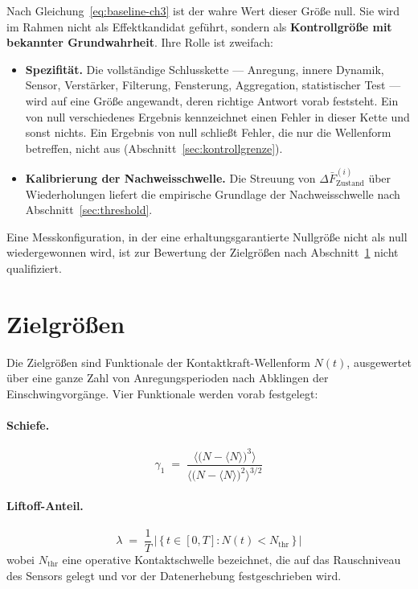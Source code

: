 \documentclass[12pt,a4paper]{report}
\begin{document}
Nach Gleichung~\eqref{eq:baseline-ch3} ist der wahre Wert dieser Größe
null. Sie wird im Rahmen nicht als Effektkandidat geführt, sondern als
\textbf{Kontrollgröße mit bekannter Grundwahrheit}. Ihre Rolle ist
zweifach:

\begin{itemize}
  \item \textbf{Spezifität.} Die vollständige Schlusskette --- Anregung,
        innere Dynamik, Sensor, Verstärker, Filterung, Fensterung,
        Aggregation, statistischer Test --- wird auf eine Größe
        angewandt, deren richtige Antwort vorab feststeht. Ein von null
        verschiedenes Ergebnis kennzeichnet einen Fehler in dieser Kette
        und sonst nichts. Ein Ergebnis von null schließt Fehler, die nur
        die Wellenform betreffen, nicht aus
        (Abschnitt~\ref{sec:kontrollgrenze}).
  \item \textbf{Kalibrierung der Nachweisschwelle.} Die Streuung von
        $\Delta \bar{F}^{(i)}_{\mathrm{Zustand}}$ über Wiederholungen
        liefert die empirische Grundlage der Nachweisschwelle nach
        Abschnitt~\ref{sec:threshold}.
\end{itemize}

Eine Messkonfiguration, in der eine erhaltungsgarantierte Nullgröße nicht
als null wiedergewonnen wird, ist zur Bewertung der Zielgrößen nach
Abschnitt~\ref{sec:target-quantities} nicht qualifiziert.

\section{Zielgrößen}
\label{sec:target-quantities}

Die Zielgrößen sind Funktionale der Kontaktkraft-Wellenform $N(t)$,
ausgewertet über eine ganze Zahl von Anregungsperioden nach Abklingen der
Einschwingvorgänge. Vier Funktionale werden vorab festgelegt:

\paragraph{Schiefe.}
\begin{equation}
  \gamma_1 \;=\;
  \frac{\bigl\langle \bigl(N - \langle N\rangle\bigr)^3 \bigr\rangle}
       {\bigl\langle \bigl(N - \langle N\rangle\bigr)^2 \bigr\rangle^{3/2}}
  \label{eq:skewness}
\end{equation}

\paragraph{Liftoff-Anteil.}
\begin{equation}
  \lambda \;=\;
  \frac{1}{T}\,\bigl|\,\{\,t \in [0,T] : N(t) < N_{\mathrm{thr}} \,\}\,\bigr|
  \label{eq:liftoff}
\end{equation}
wobei $N_{\mathrm{thr}}$ eine operative Kontaktschwelle bezeichnet, die
auf das Rauschniveau des Sensors gelegt und vor der Datenerhebung
festgeschrieben wird.
\end{document}
